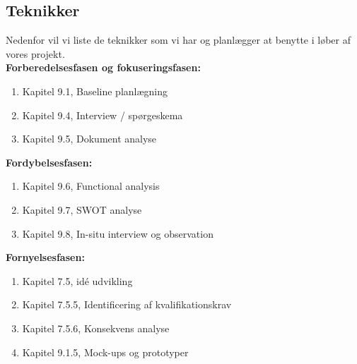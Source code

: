 \subsection{Teknikker}
Nedenfor vil vi liste de teknikker som vi har og planlægger at benytte i løber af vores projekt.\\ 

\textbf{Forberedelsesfasen og fokuseringsfasen:}
\begin{enumerate}
	\item Kapitel 9.1, Baseline planlægning
	\item Kapitel 9.4, Interview / spørgeskema
	\item Kapitel 9.5, Dokument analyse
\end{enumerate}
\textbf{Fordybelsesfasen:}
\begin{enumerate}
	\item Kapitel 9.6, Functional analysis
	\item Kapitel 9.7, SWOT analyse
	\item Kapitel 9.8, In-situ interview og observation
\end{enumerate}
\textbf{Fornyelsesfasen:}
\begin{enumerate}
	\item Kapitel 7.5, idé udvikling
	\item Kapitel 7.5.5, Identificering af kvalifikationskrav
	\item Kapitel 7.5.6, Konsekvens analyse
	\item Kapitel 9.1.5, Mock-ups og prototyper
\end{enumerate}
